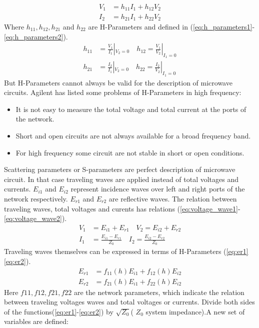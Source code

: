 \begin{align}
V_{1}&=h_{11}I_{1}+h_{12}V_{2}\\
I_{2}&=h_{21}I_{1}+h_{22}V_{2}
\label{eq:voltage_current}
\end{align}
Where $h_{11},h_{12},h_{21}$ and $h_{22}$ are H-Parameters and defined in (\ref{eq:h_parameters1}-\ref{eq:h_parameters2}).
\begin{align}
h_{11}&=\frac{V_{1}}{I_{1}}|_{V_{2}=0}\quad h_{12}=\frac{V_{1}}{V_{2}}|_{I_{1}=0}
\label{eq:h_parameters1}\\
h_{21}&=\frac{I_{2}}{I_{1}}|_{V_{2}=0}\quad h_{22}=\frac{I_{2}}{V_{2}}|_{I_{1}=0}
\label{eq:h_parameters2}
\end{align}
But H-Parameters cannot always be valid for the description of microwave circuits. Agilent\cite{aglient_s_parameters} has listed some problems of H-Parameters in high frequency:
\begin{itemize}
\item It is not easy to measure the total voltage and total current at the ports of the network.
\item Short and open circuits are not always available for a broad frequency band.
\item For high frequency some circuit are not stable in short or open conditions.
\end{itemize}
Scattering parameters or S-parameters are perfect description of microwave circuit\cite{RF194_s_parameters}. In that case traveling waves are applied instead of total voltages and currents. $E_{i1}$ and $E_{i2}$ represent incidence waves over left and right ports of the network respectively. $E_{r1}$ and $E_{r2}$ are reflective waves. The relation between traveling waves, total voltages and curents has relations (\ref{eq:voltage_wave1}-\ref{eq:voltage_wave2}).
\begin{align}
V_{1}&=E_{i1}+E_{r1}\quad V_{2}=E_{i2}+E_{r2}
\label{eq:voltage_wave1}\\
I_{1}&=\frac{E_{i1}-E_{r1}}{Z_{0}}\quad I_{2}=\frac{E_{i2}-E_{r2}}{Z_{0}}
\label{eq:voltage_wave2}
\end{align}
Traveling waves themselves can be expressed in terms of H-Parameters (\ref{eq:er1}\ref{eq:er2}). 
\begin{align}
E_{r1}&=f_{11}(h)E_{i1}+f_{12}(h)E_{i2}
\label{eq:er1}
\\
E_{r2}&=f_{21}(h)E_{i1}+f_{22}(h)E_{i2}
\label{eq:er2}
\end{align}
Here $f11, f12, f21, f22$ are the network parameters, which indicate the relation between traveling voltages waves and total voltages or currents. Divide both sides of the functions(\ref{eq:er1}-\ref{eq:er2}) by $\sqrt{Z_{0}}$( $Z_{0}$ system impedance).A new set of variables are defined:
